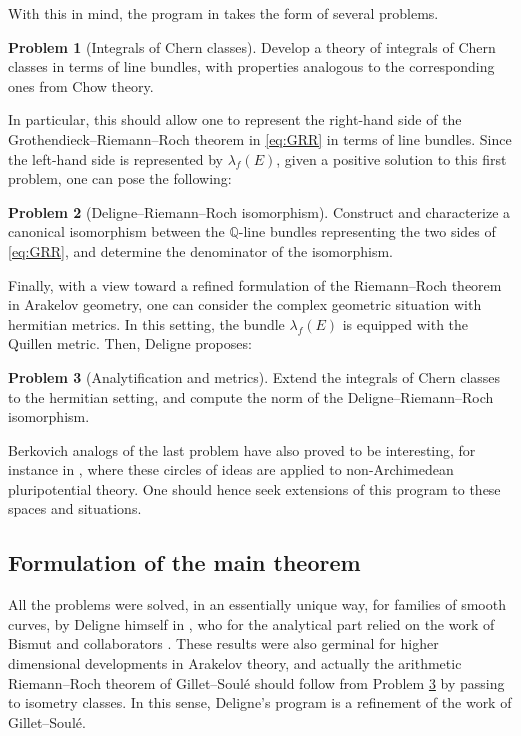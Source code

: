 \documentclass[JEP,XML,SOM,Unicode,published]{cedram}
\theoremstyle{plain}
\theoremstyle{definition}
\newtheorem{problem-Deligne}{Problem}
\newcommand{\QBbb}{\mathbb Q}
\begin{document}
With this in mind, the program in \cite{Deligne-determinant} takes the form of several problems.

\begin{problem-Deligne} [Integrals of Chern classes]\label{problem1}
Develop a theory of integrals of Chern classes in terms of line bundles, with properties analogous to the corresponding ones from Chow theory.
\end{problem-Deligne}

In particular, this should allow one to represent the right-hand side of the Grothendieck--Riemann--Roch theorem in \eqref{eq:GRR} in terms of line bundles. Since the left-hand side is represented by $\lambda_f(E)$, given a positive solution to this first problem, one can pose the following:

\begin{problem-Deligne} [Deligne--Riemann--Roch isomorphism]\label{problem2}
Construct and characterize a canonical isomorphism between the $\QBbb$-line bundles representing the two sides of \eqref{eq:GRR}, and determine the denominator of the isomorphism.
\end{problem-Deligne}

Finally, with a view toward a refined formulation of the Riemann--Roch theorem in Arakelov geometry, one can consider the complex geometric situation with hermitian metrics. In this setting, the bundle $\lambda_f(E)$ is equipped with the Quillen metric. Then, Deligne proposes:

\begin{problem-Deligne}[Analytification and metrics]\label{problem3}
Extend the integrals of Chern classes to the hermitian setting, and compute the norm of the Deligne--Riemann--Roch isomorphism.
\end{problem-Deligne}

Berkovich analogs of the last problem have also proved to be interesting, for instance in \cite{Boucksom-Eriksson, SebWalMarDiff}, where these circles of ideas are applied to non-Archimedean pluripotential theory. One should hence seek extensions of this program to these spaces and situations.\enlargethispage{\baselineskip}%

\subsection{Formulation of the main theorem} All the problems were solved, in an essen\-tially unique way, for families of smooth curves, by Deligne himself in \cite{Deligne-determinant}, who for the analytical part relied on the work of Bismut and collaborators \cite{freed1, freed2, BGS1, BGS2, BGS3}. These results were also germinal for higher dimensional developments in Arakelov theory, and actually the arithmetic Riemann--Roch theorem of Gillet--Soulé \cite{GS-ARR} should follow from Problem \ref{problem3} by passing to isometry classes. In this sense, Deligne's program is a refinement of the work of Gillet--Soulé.
\end{document}
